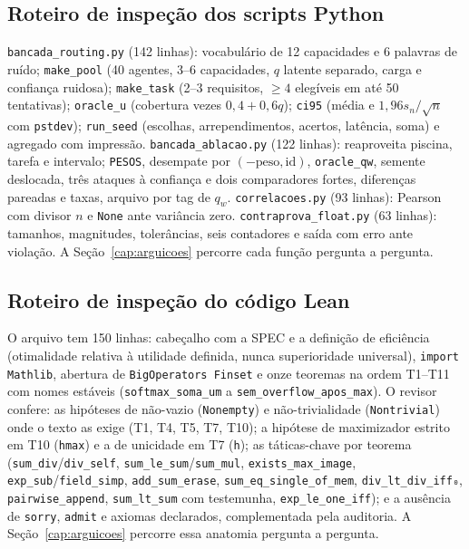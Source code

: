 \subsection{Roteiro de inspeção dos scripts Python}
\texttt{bancada\_routing.py} (142 linhas): vocabulário de 12 capacidades e 6 palavras de ruído; \texttt{make\_pool} (40 agentes, 3--6 capacidades, $q$ latente separado, carga e confiança ruidosa); \texttt{make\_task} (2--3 requisitos, $\geq4$ elegíveis em até 50 tentativas); \texttt{oracle\_u} (cobertura vezes $0{,}4+0{,}6q$); \texttt{ci95} (média e $1{,}96s_n/\sqrt{n}$ com \texttt{pstdev}); \texttt{run\_seed} (escolhas, arrependimentos, acertos, latência, soma) e agregado com impressão. \texttt{bancada\_ablacao.py} (122 linhas): reaproveita piscina, tarefa e intervalo; \texttt{PESOS}, desempate por $(-\mathrm{peso}, \mathrm{id})$, \texttt{oracle\_qw}, semente deslocada, três ataques à confiança e dois comparadores fortes, diferenças pareadas e taxas, arquivo por tag de $q_w$. \texttt{correlacoes.py} (93 linhas): Pearson com divisor $n$ e \texttt{None} ante variância zero. \texttt{contraprova\_float.py} (63 linhas): tamanhos, magnitudes, tolerâncias, seis contadores e saída com erro ante violação. A Seção~\ref{cap:arguicoes} percorre cada função pergunta a pergunta.
\subsection{Roteiro de inspeção do código Lean}
O arquivo tem 150 linhas: cabeçalho com a SPEC e a definição de eficiência (otimalidade relativa à utilidade definida, nunca superioridade universal), \texttt{import Mathlib}, abertura de \texttt{BigOperators Finset} e onze teoremas na ordem T1--T11 com nomes estáveis (\texttt{softmax\_soma\_um} a \texttt{sem\_overflow\_apos\_max}). O revisor confere: as hipóteses de não-vazio (\texttt{Nonempty}) e não-trivialidade (\texttt{Nontrivial}) onde o texto as exige (T1, T4, T5, T7, T10); a hipótese de maximizador estrito em T10 (\texttt{hmax}) e a de unicidade em T7 (\texttt{h}); as táticas-chave por teorema (\texttt{sum\_div}/\texttt{div\_self}, \texttt{sum\_le\_sum}/\texttt{sum\_mul}, \texttt{exists\_max\_image}, \texttt{exp\_sub}/\texttt{field\_simp}, \texttt{add\_sum\_erase}, \texttt{sum\_eq\_single\_of\_mem}, \texttt{div\_lt\_div\_iff₀}, \texttt{pairwise\_append}, \texttt{sum\_lt\_sum} com testemunha, \texttt{exp\_le\_one\_iff}); e a ausência de \texttt{sorry}, \texttt{admit} e axiomas declarados, complementada pela auditoria. A Seção~\ref{cap:arguicoes} percorre essa anatomia pergunta a pergunta.
